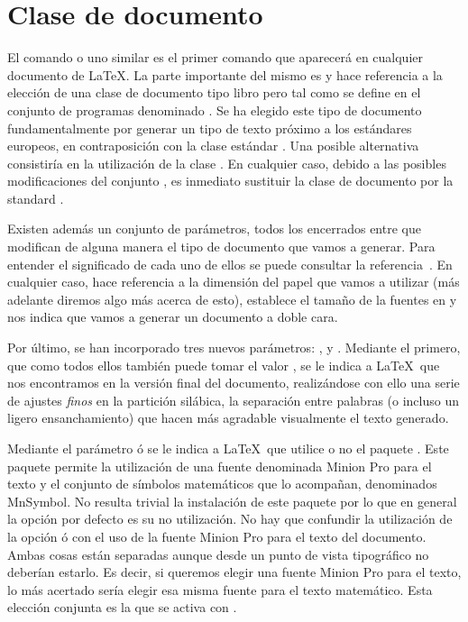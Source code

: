 \section{Clase de documento}
El comando  o uno similar es el primer comando que aparecerá en cualquier documento de \LaTeX. La parte importante del mismo es  y hace referencia a la elección de una  clase de documento tipo libro pero tal como se define en el conjunto de programas denominado . Se ha elegido este tipo de documento fundamentalmente por generar un tipo de texto próximo a los estándares europeos, en contraposición con la clase estándar . Una posible alternativa consistiría en la utilización de la clase . En cualquier caso, debido a las posibles modificaciones del conjunto , es inmediato sustituir la clase de documento por la standard .

Existen además un conjunto de parámetros, todos los encerrados entre \ttcolor{[...]} que modifican de alguna manera el tipo de documento que vamos a generar. Para entender el significado de cada uno de ellos se puede consultar la referencia~\cite{koma}. En cualquier caso,  hace referencia a la dimensión del papel que vamos a utilizar (más adelante diremos algo más acerca de esto), \ttcolor{10pt} establece el tamaño de la fuentes en  y  nos indica que vamos a generar un documento a doble cara. 

Por último, se han incorporado tres nuevos parámetros: ,  y . Mediante el primero, que como todos ellos también puede tomar el valor , se le indica a \LaTeX\ que nos encontramos en la versión final del documento, realizándose con ello una serie de ajustes \emph{finos} en la partición silábica, la separación entre palabras (o incluso un ligero ensanchamiento) que hacen más agradable visualmente el texto generado. 

Mediante el parámetro  ó  se le indica a  \LaTeX\ que utilice o no el paquete . Este paquete permite la utilización de una fuente denominada Minion Pro para el texto y el conjunto de símbolos matemáticos que lo acompañan, denominados MnSymbol. No resulta trivial la instalación de este paquete por lo que en general la opción por defecto es su no utilización. No hay que confundir la utilización de la opción  ó  con el uso de la fuente Minion Pro para el texto del documento. Ambas cosas están separadas aunque desde un punto de vista tipográfico no deberían estarlo. Es decir, si queremos elegir una fuente Minion Pro para el texto, lo más acertado sería elegir esa misma fuente para el texto matemático. Esta elección conjunta es la que se activa con .

